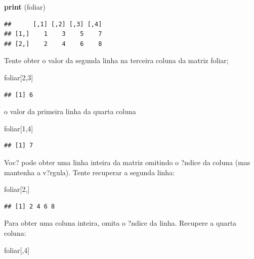 \documentclass[]{book}
\newenvironment{Shaded}{\begin{snugshade}}{\end{snugshade}}
\newcommand{\DecValTok}[1]{\textcolor[rgb]{0.00,0.00,0.81}{#1}}
\newcommand{\KeywordTok}[1]{\textcolor[rgb]{0.13,0.29,0.53}{\textbf{#1}}}
\newcommand{\NormalTok}[1]{#1}
\begin{document}
\begin{Shaded}
\begin{Highlighting}[]
\KeywordTok{print}\NormalTok{ (foliar)}
\end{Highlighting}
\end{Shaded}

\begin{verbatim}
##      [,1] [,2] [,3] [,4]
## [1,]    1    3    5    7
## [2,]    2    4    6    8
\end{verbatim}

Tente obter o valor da segunda linha na terceira coluna da matriz foliar;

\begin{Shaded}
\begin{Highlighting}[]
\NormalTok{foliar[}\DecValTok{2}\NormalTok{,}\DecValTok{3}\NormalTok{]}
\end{Highlighting}
\end{Shaded}

\begin{verbatim}
## [1] 6
\end{verbatim}

o valor da primeira linha da quarta coluna

\begin{Shaded}
\begin{Highlighting}[]
\NormalTok{foliar[}\DecValTok{1}\NormalTok{,}\DecValTok{4}\NormalTok{]}
\end{Highlighting}
\end{Shaded}

\begin{verbatim}
## [1] 7
\end{verbatim}

Voc? pode obter uma linha inteira da matriz omitindo o ?ndice da coluna (mas mantenha a v?rgula). Tente recuperar a segunda linha:

\begin{Shaded}
\begin{Highlighting}[]
\NormalTok{foliar[}\DecValTok{2}\NormalTok{,]}
\end{Highlighting}
\end{Shaded}

\begin{verbatim}
## [1] 2 4 6 8
\end{verbatim}

Para obter uma coluna inteira, omita o ?ndice da linha. Recupere a quarta coluna:

\begin{Shaded}
\begin{Highlighting}[]
\NormalTok{foliar[,}\DecValTok{4}\NormalTok{]}
\end{Highlighting}
\end{Shaded}
\end{document}
